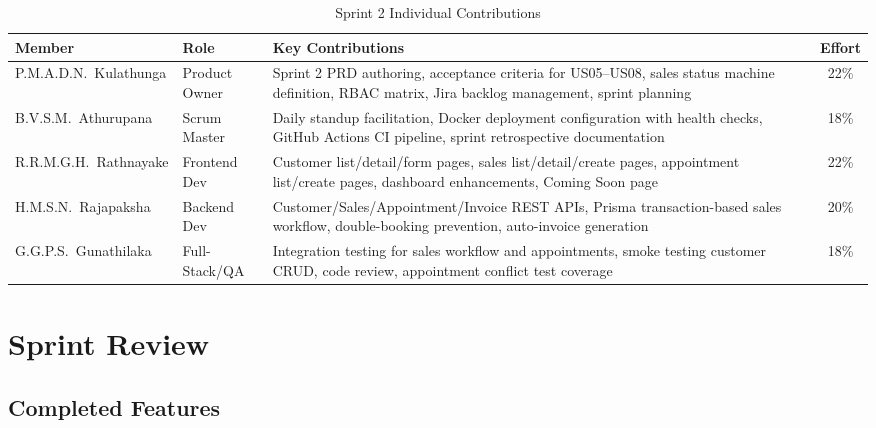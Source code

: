 \documentclass[12pt,a4paper]{article}
\newcommand{\thead}[1]{\textbf{\color{white}#1}}
\begin{document}
\begin{table}[H]
\centering
\renewcommand{\arraystretch}{1.35}
\footnotesize
\begin{tabularx}{\textwidth}{|l|l|Y|c|}
\hline
{} \thead{Member} & \thead{Role} & \thead{Key Contributions} & \thead{Effort} \\
\hline
P.M.A.D.N.\ Kulathunga & Product Owner & Sprint 2 PRD authoring, acceptance criteria for US05--US08, sales status machine definition, RBAC matrix, Jira backlog management, sprint planning & 22\% \\
\hline
{}
B.V.S.M.\ Athurupana & Scrum Master & Daily standup facilitation, Docker deployment configuration with health checks, GitHub Actions CI pipeline, sprint retrospective documentation & 18\% \\
\hline
R.R.M.G.H.\ Rathnayake & Frontend Dev & Customer list/detail/form pages, sales list/detail/create pages, appointment list/create pages, dashboard enhancements, Coming Soon page & 22\% \\
\hline
{}
H.M.S.N.\ Rajapaksha & Backend Dev & Customer/Sales/Appointment/Invoice REST APIs, Prisma transaction-based sales workflow, double-booking prevention, auto-invoice generation & 20\% \\
\hline
G.G.P.S.\ Gunathilaka & Full-Stack/QA & Integration testing for sales workflow and appointments, smoke testing customer CRUD, code review, appointment conflict test coverage & 18\% \\
\hline
\end{tabularx}
\caption{Sprint 2 Individual Contributions}
\end{table}

\section{Sprint Review}

\subsection{Completed Features}
\end{document}
